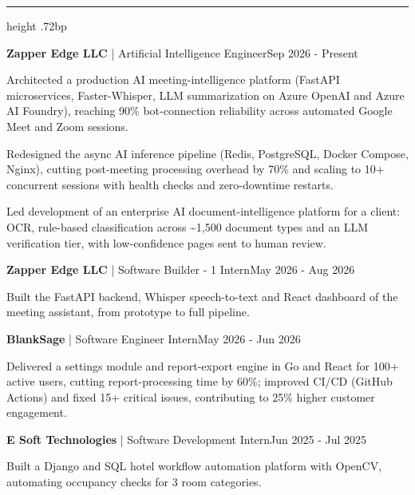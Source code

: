 \documentclass[10pt]{article}
\newcommand{\resumesection}[1]{\par\vspace{5.4bp}{\fontsize{10.56bp}{12.5bp}\selectfont\bfseries #1\par}\vspace{1bp}\hrule height .72bp\vspace{3.2bp}}
\newcommand{\entry}[2]{\par #1\hfill #2\par}
\newcommand{\nextentry}[2]{\par\vspace{1.5bp}\entry{#1}{#2}}
\newcommand{\bulletitem}[1]{\par\begingroup\hangindent=11.52bp\hangafter=1\noindent\makebox[11.52bp][l]{\textbullet}#1\par\endgroup}
\begin{document}
\resumesection{EXPERIENCE}
\entry{\textbf{Zapper Edge LLC} | Artificial Intelligence Engineer}{Sep 2026 - Present}
\bulletitem{Architected a production AI meeting-intelligence platform (FastAPI microservices, Faster-Whisper, LLM summarization on Azure OpenAI and Azure AI Foundry), reaching 90\% bot-connection reliability across automated Google Meet and Zoom sessions.}
\bulletitem{Redesigned the async AI inference pipeline (Redis, PostgreSQL, Docker Compose, Nginx), cutting post-meeting processing overhead by 70\% and scaling to 10+ concurrent sessions with health checks and zero-downtime restarts.}
\bulletitem{Led development of an enterprise AI document-intelligence platform for a client: OCR, rule-based classification across \textasciitilde1,500 document types and an LLM verification tier, with low-confidence pages sent to human review.}
\nextentry{\textbf{Zapper Edge LLC} | Software Builder - 1 Intern}{May 2026 - Aug 2026}
\bulletitem{Built the FastAPI backend, Whisper speech-to-text and React dashboard of the meeting assistant, from prototype to full pipeline.}
\nextentry{\textbf{BlankSage} | Software Engineer Intern}{May 2026 - Jun 2026}
\bulletitem{Delivered a settings module and report-export engine in Go and React for 100+ active users, cutting report-processing time by 60\%; improved CI/CD (GitHub Actions) and fixed 15+ critical issues, contributing to 25\% higher customer engagement.}
\nextentry{\textbf{E Soft Technologies} | Software Development Intern}{Jun 2025 - Jul 2025}
\bulletitem{Built a Django and SQL hotel workflow automation platform with OpenCV, automating occupancy checks for 3 room categories.}
\end{document}
